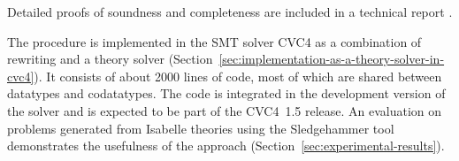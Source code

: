 
\begin{conf}
Detailed proofs of soundness and completeness are included in a technical report
\cite{our-report}.
\end{conf}%
The procedure is implemented in the SMT solver CVC4 \cite{barrett-et-al-2011} as a combination
of rewriting and a theory solver (Section~\ref{sec:implementation-as-a-theory-solver-in-cvc4}).
It consists of about 2000 lines of \cpp{} code, %
most of which are shared between datatypes and codatatypes. The code is
integrated in the development version of the solver and is expected to be part
of the CVC4~1.5 release.
%
An evaluation on %
problems generated from Isabelle theories using the Sledgehammer tool \cite{paulson-blanchette-2010}
demonstrates the usefulness of the approach (Section~\ref{sec:experimental-results}).



%








